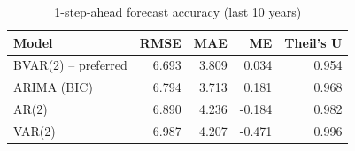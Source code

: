 \begin{table}

\caption{\label{tab:forecast_acc}1-step-ahead forecast accuracy (last 10 years)}
\centering
\begin{tabular}[t]{lrrrr}
\toprule
Model & RMSE & MAE & ME & Theil's U\\
\midrule
BVAR(2) -- preferred & 6.693 & 3.809 & 0.034 & 0.954\\
ARIMA (BIC) & 6.794 & 3.713 & 0.181 & 0.968\\
AR(2) & 6.890 & 4.236 & -0.184 & 0.982\\
VAR(2) & 6.987 & 4.207 & -0.471 & 0.996\\
\bottomrule
\end{tabular}
\end{table}

